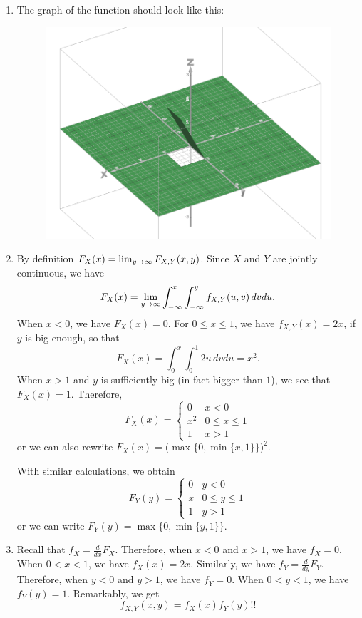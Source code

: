 \begin{sol*}
\begin{enumerate}[label=\alph*)]
    \item The graph of the function should look like this:
        \begin{figure}[ht]
        \centering 
        \includegraphics[scale=0.2]{MarginalIndependenceGraphChapE.png}
        \end{figure}
    \item By definition $F_X (x) = \lim_{y \rightarrow \infty} F_{X, Y} (x, y)$. Since $X$ and $Y$ are jointly continuous, we have
        \[
            F_X (x) = \lim_{y \rightarrow \infty} \int_{-\infty}^x \int_{-\infty}^y f_{X, Y} (u, v) \, dv du .
        \]
    When $x < 0$, we have $F_X (x) = 0$. For $0 \leq x \leq 1$, we have $f_{X, Y} (x) = 2x$, if $y$ is big enough, so that
        \[
            F_X (x) = \int_{0}^x \int_0^1 2u \, dv du = x^2 .
        \]
    When $x > 1$ and $y$ is sufficiently big (in fact bigger than $1$), we see that $F_X (x) = 1$. Therefore, 
    $$
        F_X (x) = \left\lbrace \begin{matrix} 0 & x < 0 \\ x^2 & 0 \leq x \leq 1 \\ 1 & x > 1 \end{matrix} \right.
    $$
    or we can also rewrite $F_X (x) = \big( \max \{ 0, \min \{ x , 1 \} \} \big)^2$. 

    With similar calculations, we obtain
        $$ 
            F_Y (y) = \left\lbrace \begin{matrix} 0 & y < 0 \\ x & 0 \leq y \leq 1 \\ 1 & y > 1 \end{matrix} \right. 
        $$ 
    or we can write $F_Y (y) = \max \{ 0 , \min \{ y, 1 \} \}$. 
    \item Recall that $f_X = \frac{d}{dx} F_X$. Therefore, when $x < 0$ and $x > 1$, we have $f_X = 0$. When $0 < x < 1$, we have $f_X (x) = 2x$. Similarly, we have $f_Y = \frac{d}{dy} F_Y$. Therefore, when $y < 0$ and $y > 1$, we have $f_Y = 0$. When $0 < y < 1$, we have $f_Y (y) = 1$. Remarkably, we get
        \[
            f_{X, Y} (x, y) = f_X (x) f_Y (y) !! \tag*{$\triangle$}
        \]
\end{enumerate}
\end{sol*}

